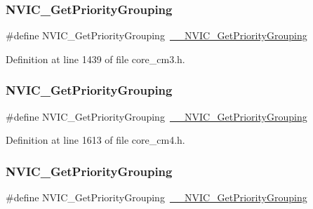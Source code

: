 \subsubsection{\texorpdfstring{N\+V\+I\+C\+\_\+\+Get\+Priority\+Grouping}{NVIC\_GetPriorityGrouping}\hspace{0.1cm}{\footnotesize\ttfamily [6/11]}}
{\footnotesize\ttfamily \#define N\+V\+I\+C\+\_\+\+Get\+Priority\+Grouping~\hyperlink{group___c_m_s_i_s___core___n_v_i_c_functions_ga9b894af672df4373eb637f8288845c05}{\+\_\+\+\_\+\+N\+V\+I\+C\+\_\+\+Get\+Priority\+Grouping}}



Definition at line 1439 of file core\+\_\+cm3.\+h.

\mbox{\label{group___c_m_s_i_s___core___n_v_i_c_functions_ga4eeb9214f2264fc23c34ad5de2d3fa11}} 
\subsubsection{\texorpdfstring{N\+V\+I\+C\+\_\+\+Get\+Priority\+Grouping}{NVIC\_GetPriorityGrouping}\hspace{0.1cm}{\footnotesize\ttfamily [7/11]}}
{\footnotesize\ttfamily \#define N\+V\+I\+C\+\_\+\+Get\+Priority\+Grouping~\hyperlink{group___c_m_s_i_s___core___n_v_i_c_functions_ga9b894af672df4373eb637f8288845c05}{\+\_\+\+\_\+\+N\+V\+I\+C\+\_\+\+Get\+Priority\+Grouping}}



Definition at line 1613 of file core\+\_\+cm4.\+h.

\mbox{\label{group___c_m_s_i_s___core___n_v_i_c_functions_ga4eeb9214f2264fc23c34ad5de2d3fa11}} 
\subsubsection{\texorpdfstring{N\+V\+I\+C\+\_\+\+Get\+Priority\+Grouping}{NVIC\_GetPriorityGrouping}\hspace{0.1cm}{\footnotesize\ttfamily [8/11]}}
{\footnotesize\ttfamily \#define N\+V\+I\+C\+\_\+\+Get\+Priority\+Grouping~\hyperlink{group___c_m_s_i_s___core___n_v_i_c_functions_ga9b894af672df4373eb637f8288845c05}{\+\_\+\+\_\+\+N\+V\+I\+C\+\_\+\+Get\+Priority\+Grouping}}



